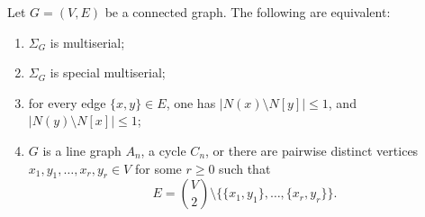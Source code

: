 \documentclass[a4paper,leqno]{amsart}
\begin{document}
\begin{prop}\label{prop:multiserial}
Let $G=(V,E)$ be a connected graph. The following are equivalent:
\begin{enumerate}
\item $\Sigma_G$ is multiserial;
\item $\Sigma_G$ is special multiserial;
\item for every edge $\{x,y\}\in E$, one has
$\left|N(x)\setminus N[y]\right|\leq1$, and $\left|N(y)\setminus N[x]\right|\leq1$;
\item $G$ is a line graph $A_n$, a cycle $C_n$, or there are pairwise distinct vertices $x_1,y_1,\ldots,x_r,y_r\in V$ for some $r\geq0$ such that
$$E=\binom{V}{2}\setminus
\bigl\{\{x_1,y_1\},\ldots,\{x_r,y_r\}\bigr\}.$$
\end{enumerate}
\end{prop}
\end{document}
